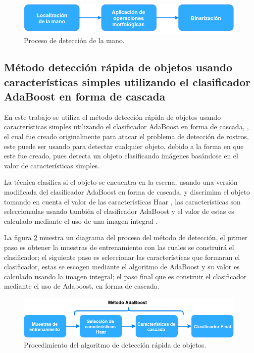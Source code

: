 \begin{figure}[h!]
\begin{center}
\includegraphics[scale=.7]{./Figures/Detection.png}
\end{center}
\caption{Proceso de detección de la mano.}
\label{fig:ProcesoDeteccion}
\end{figure} 

\subsection{Método detección rápida de objetos usando características simples utilizando el clasificador AdaBoost en forma de cascada}\label{subsec:ViolaJones}

En este trabajo se utiliza el método detección rápida de objetos usando características simples utilizando el clasificador AdaBoost en forma de cascada, \citep{Viola2001}, el cual fue creado originalmente para atacar el problema de detección de rostros, este puede ser usando para detectar cualquier objeto, debido a la forma en que este fue creado, pues detecta un objeto clasificando imágenes basándose en el valor de características simples.

La técnica clasifica si el objeto se encuentra en la escena, usando una versión modificada del clasificador AdaBoost \citep{Freund1995} en forma de cascada, y discrimina el objeto tomando en cuenta el valor de las características Haar \citep{Viola2001}, las características son seleccionadas usando también el clasificador AdaBoost y el valor de estas es calculado mediante el uso de una imagen integral \citep{Viola2001}. 

La figura \ref{fig:ViolaJonesDiagram} muestra un diagrama del proceso del método de detección, el primer paso es obtener la muestras de entrenamiento con las cuales se construirá el clasificador; el siguiente paso es seleccionar las características que formaran el clasificador, estas se escogen mediante el algoritmo de AdaBoost y su valor es calculado usando la imagen integral; el paso final que es construir el clasificador mediante el uso de Adaboost,  en forma de cascada.

\begin{figure}[h!]
\begin{center}
\includegraphics[scale=.6]{./Figures/ViolaJonesDiagram.png}
\end{center}
\caption{Procedimiento del algoritmo de detección rápida de objetos.}
\label{fig:ViolaJonesDiagram}
\end{figure}

